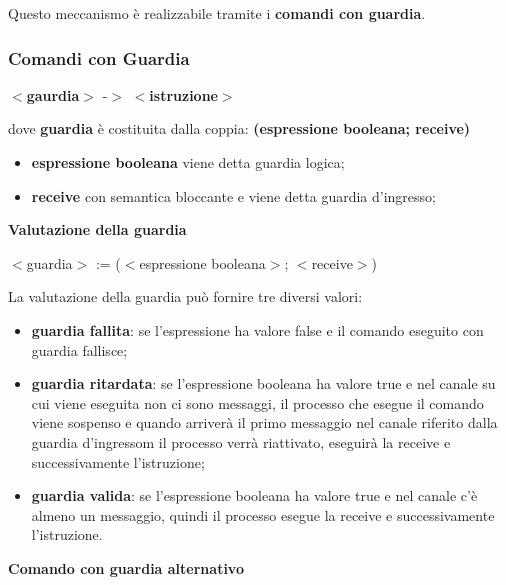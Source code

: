 \documentclass{article}
\begin{document}
Questo meccanismo è realizzabile tramite i \textbf{comandi con guardia}.

\subsubsection{Comandi con Guardia}

\begin{center}
$<$\textbf{gaurdia}$>$ -$>$ $<$\textbf{istruzione}$>$
\end{center}

dove \textbf{guardia} è costituita dalla coppia: \textbf{(espressione booleana; receive)}
\begin{itemize}
    \item \textbf{espressione booleana} viene detta guardia logica;
    \item \textbf{receive} con semantica bloccante e viene detta guardia d'ingresso;
\end{itemize}

\vspace{5mm}
\textbf{Valutazione della guardia}

\vspace{3mm}
\begin{center}
$<$guardia$>$ := ($<$espressione booleana$>$; $<$receive$>$)
\end{center}

La valutazione della guardia può fornire tre diversi valori:
\begin{itemize}
    \item \textbf{guardia fallita}: se l'espressione ha valore false e il comando eseguito con guardia fallisce;
    \item \textbf{guardia ritardata}: se l'espressione booleana ha valore true e nel canale su cui viene eseguita non ci sono messaggi, il processo che esegue il comando viene sospenso
        e quando arriverà il primo messaggio nel canale riferito dalla guardia d'ingressom il processo verrà riattivato, eseguirà la receive e successivamente l'istruzione;
    \item \textbf{guardia valida}: se l'espressione booleana ha valore true e nel canale c'è almeno un messaggio, quindi il processo esegue la receive e successivamente l'istruzione.
\end{itemize}

\vspace{5mm}
\textbf{Comando con guardia alternativo}

\vspace{3mm}
\end{document}
